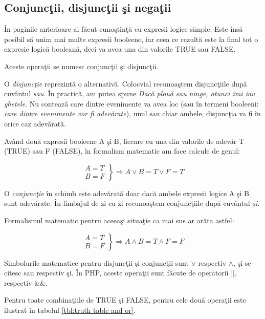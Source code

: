 \subsection{Conjuncţii, disjuncţii şi negaţii}
În paginile anterioare ai făcut cunoştinţă cu expresii logice
simple. Este însă posibil să unim mai multe expresii booleene,
iar ceea ce rezultă este la final tot o expresie logică booleană,
deci va avea una din valorile TRUE sau FALSE.

Aceste operaţii se numesc conjuncţii şi disjuncţii.

O \textsl{disjuncţie}
reprezintă o alternativă. Colocvial recunoaştem disjuncţiile
după cuvântul \textit{sau}. În practică, am putea spune
\textit{Dacă plouă sau ninge, atunci îmi iau ghetele}. Nu contează
care dintre evenimente va avea loc (sau în termeni booleeni: \textit{care dintre
evenimente {\glqq}vor fi adevărate{\grqq}}), unul sau chiar ambele, disjuncţia
va fi în orice caz adevărată.

Având două expresii booleene A şi B, fiecare cu una din valorile de
adevăr T (TRUE) sau F (FALSE), în formalism matematic am face calcule de genul:

\[ 
  \left.
  \begin{array}{c}
    A = T\\
    B = F
  \end{array}
  \right\}
  \Rightarrow A \lor B = T \lor F = T
\]

O \textsl{conjuncţie} în schimb este adevărată doar dacă ambele expresii logice A şi B
sunt adevărate. În limbajul de zi cu zi recunoaştem conjuncţiile după cuvântul \textit{şi}.

Formalismul matematic pentru aceeaşi situaţie ca mai sus ar arăta astfel:

\[ 
  \left.
  \begin{array}{c}
    A = T\\
    B = F
  \end{array}
  \right\}
  \Rightarrow A \land B = T \land F = F
\]

Simbolurile matematice pentru disjuncţii şi conjuncţii sunt $\lor$ respectiv $\land$, şi se citesc
{\glqq}sau{\grqq} respectiv {\glqq}şi{\grqq}. În PHP, aceste operaţii sunt făcute de operatorii {\glqq}||{\grqq}, respectiv {\glqq}\&\&{\grqq}.

Pentru toate combinaţiile de TRUE şi FALSE,
 pentru
cele două operaţii este ilustrat în tabelul \ref{tbl:truth table and or}.



